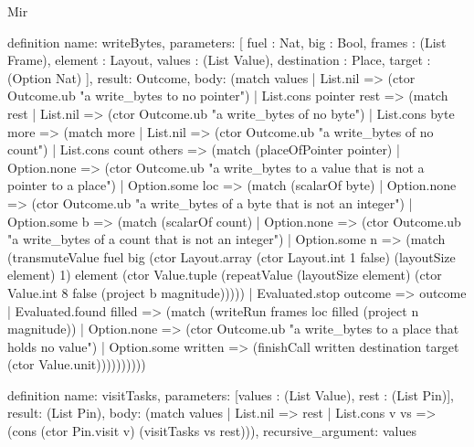 \begin{lexlean}{Mir}
\begin{semanticmodule}
definition{
  name: writeBytes,
  parameters: [
    fuel : Nat,
    big : Bool,
    frames : (List Frame),
    element : Layout,
    values : (List Value),
    destination : Place,
    target : (Option Nat)
  ],
  result: Outcome,
  body: (match values
    | List.nil => (ctor Outcome.ub "a write_bytes to no pointer")
    | List.cons pointer rest => (match rest
      | List.nil => (ctor Outcome.ub "a write_bytes of no byte")
      | List.cons byte more => (match more
        | List.nil => (ctor Outcome.ub "a write_bytes of no count")
        | List.cons count others => (match (placeOfPointer pointer)
          | Option.none => (ctor Outcome.ub "a write_bytes to a value that is not a pointer to a place")
          | Option.some loc => (match (scalarOf byte)
            | Option.none => (ctor Outcome.ub "a write_bytes of a byte that is not an integer")
            | Option.some b => (match (scalarOf count)
              | Option.none => (ctor Outcome.ub "a write_bytes of a count that is not an integer")
              | Option.some n => (match (transmuteValue fuel big (ctor Layout.array (ctor Layout.int 1 false) (layoutSize element) 1) element (ctor Value.tuple (repeatValue (layoutSize element) (ctor Value.int 8 false (project b magnitude)))))
                | Evaluated.stop outcome => outcome
                | Evaluated.found filled => (match (writeRun frames loc filled (project n magnitude))
                  | Option.none => (ctor Outcome.ub "a write_bytes to a place that holds no value")
                  | Option.some written => (finishCall written destination target (ctor Value.unit))))))))))
}

definition{
  name: visitTasks,
  parameters: [values : (List Value), rest : (List Pin)],
  result: (List Pin),
  body: (match values
    | List.nil => rest
    | List.cons v vs => (cons (ctor Pin.visit v) (visitTasks vs rest))),
  recursive_argument: values
}


\end{semanticmodule}
\end{lexlean}
